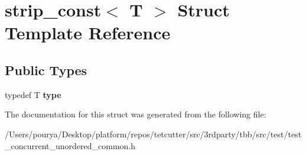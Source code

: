 \hypertarget{structstrip__const}{}\section{strip\+\_\+const$<$ T $>$ Struct Template Reference}
\label{structstrip__const}
\subsection*{Public Types}
\begin{DoxyCompactItemize}
\item 
\hypertarget{structstrip__const_a4f1dbf7dd2b6fb842db9e45f63084e19}{}typedef T {\bfseries type}\label{structstrip__const_a4f1dbf7dd2b6fb842db9e45f63084e19}

\end{DoxyCompactItemize}


The documentation for this struct was generated from the following file\+:\begin{DoxyCompactItemize}
\item 
/\+Users/pourya/\+Desktop/platform/repos/tetcutter/src/3rdparty/tbb/src/test/test\+\_\+concurrent\+\_\+unordered\+\_\+common.\+h\end{DoxyCompactItemize}

